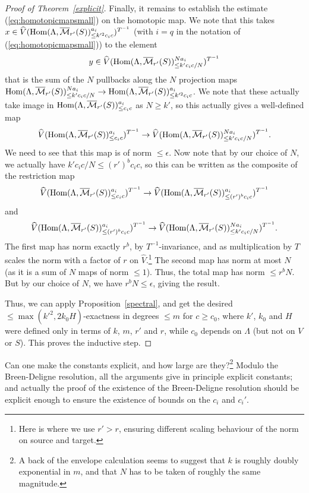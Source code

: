\begin{proof}[Proof of Theorem~\ref{explicit}]
Finally, it remains to establish the estimate (\ref{eq:homotopicmapsmall}) on the homotopic map. We note that this takes $x\in \widehat{V}(\operatorname{Hom}(\Lambda,\overline{\mathcal M}_{r'}(S))_{\leq k'^2c_ic}^{a_i})^{T^{-1}}$ (with $i=q$ in the notation of (\ref{eq:homotopicmapsmall})) to the element
\[
y\in \widehat{V}(\operatorname{Hom}(\Lambda,\overline{\mathcal M}_{r'}(S))_{\leq k'c_ic/N}^{Na_i})^{T^{-1}}
\]
that is the sum of the $N$ pullbacks along the $N$ projection maps $\operatorname{Hom}(\Lambda,\overline{\mathcal M}_{r'}(S))_{\leq k'c_ic/N}^{Na_i}\to \operatorname{Hom}(\Lambda,\overline{\mathcal M}_{r'}(S))_{\leq k'^2c_ic}^{a_i}$. We note that these actually take image in $\operatorname{Hom}(\Lambda,\overline{\mathcal M}_{r'}(S))_{\leq c_ic}^{a_i}$ as $N\geq k'$, so this actually gives a well-defined map
\[
\widehat{V}(\operatorname{Hom}(\Lambda,\overline{\mathcal M}_{r'}(S))_{\leq c_ic}^{a_i})^{T^{-1}}\to \widehat{V}(\operatorname{Hom}(\Lambda,\overline{\mathcal M}_{r'}(S))_{\leq k'c_ic/N}^{Na_i})^{T^{-1}}.
\]
We need to see that this map is of norm $\leq \epsilon$. Now note that by our choice of $N$, we actually have $k'c_ic/N\leq (r')^b c_ic$, so this can be written as the composite of the restriction map
\[
\widehat{V}(\operatorname{Hom}(\Lambda,\overline{\mathcal M}_{r'}(S))_{\leq c_ic}^{a_i})^{T^{-1}}\to \widehat{V}(\operatorname{Hom}(\Lambda,\overline{\mathcal M}_{r'}(S))_{\leq (r')^b c_ic}^{a_i})^{T^{-1}}
\]
and
\[
\widehat{V}(\operatorname{Hom}(\Lambda,\overline{\mathcal M}_{r'}(S))_{\leq (r')^b c_ic}^{a_i})^{T^{-1}}\to \widehat{V}(\operatorname{Hom}(\Lambda,\overline{\mathcal M}_{r'}(S))_{\leq k'c_ic/N}^{Na_i})^{T^{-1}}.
\]
The first map has norm exactly $r^b$, by $T^{-1}$-invariance, and as multiplication by $T$ scales the norm with a factor of $r$ on $\widehat{V}$.\footnote{Here is where we use $r'>r$, ensuring different scaling behaviour of the norm on source and target.} The second map has norm at most $N$ (as it is a sum of $N$ maps of norm $\leq 1$). Thus, the total map has norm $\leq r^bN$. But by our choice of $N$, we have $r^bN\leq \epsilon$, giving the result.

Thus, we can apply Proposition~\ref{spectral}, and get the desired $\leq \max(k'^2,2k_0H)$-exactness in degrees $\leq m$ for $c\geq c_0$, where $k'$, $k_0$ and $H$ were defined only in terms of $k$, $m$, $r'$ and $r$, while $c_0$ depends on $\Lambda$ (but not on $V$ or $S$). This proves the inductive step.
\end{proof}

\begin{question} Can one make the constants explicit, and how large are they?\footnote{A back of the envelope calculation seems to suggest that $k$ is roughly doubly exponential in $m$, and that $N$ has to be taken of roughly the same magnitude.} Modulo the Breen-Deligne resolution, all the arguments give in principle explicit constants; and actually the proof of the existence of the Breen-Deligne resolution should be explicit enough to ensure the existence of bounds on the $c_i$ and $c_i'$.
\end{question}

